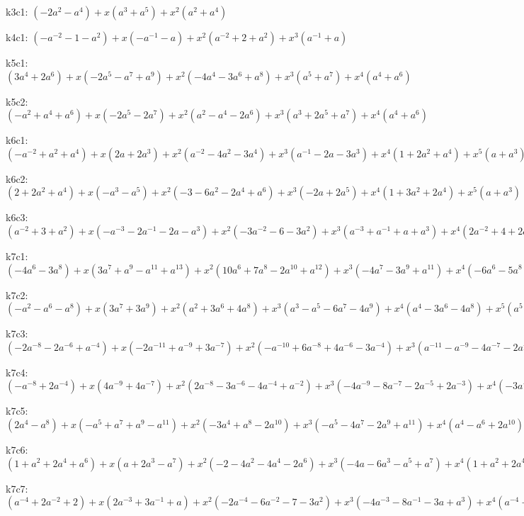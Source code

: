 k3c1: $ (-2a^{2}-a^{4}) +x(a^{3}+a^{5}) +x^{2}(a^{2}+a^{4}) $

k4c1: $ (-a^{-2}-1-a^{2}) +x(-a^{-1}-a) +x^{2}(a^{-2}+2+a^{2}) +x^{3}(a^{-1}+a) $

k5c1: $ (3a^{4}+2a^{6}) +x(-2a^{5}-a^{7}+a^{9}) +x^{2}(-4a^{4}-3a^{6}+a^{8}) +x^{3}(a^{5}+a^{7}) +x^{4}(a^{4}+a^{6}) $

k5c2: $ (-a^{2}+a^{4}+a^{6}) +x(-2a^{5}-2a^{7}) +x^{2}(a^{2}-a^{4}-2a^{6}) +x^{3}(a^{3}+2a^{5}+a^{7}) +x^{4}(a^{4}+a^{6}) $

k6c1: $ (-a^{-2}+a^{2}+a^{4}) +x(2a+2a^{3}) +x^{2}(a^{-2}-4a^{2}-3a^{4}) +x^{3}(a^{-1}-2a-3a^{3}) +x^{4}(1+2a^{2}+a^{4}) +x^{5}(a+a^{3}) $

k6c2: $ (2+2a^{2}+a^{4}) +x(-a^{3}-a^{5}) +x^{2}(-3-6a^{2}-2a^{4}+a^{6}) +x^{3}(-2a+2a^{5}) +x^{4}(1+3a^{2}+2a^{4}) +x^{5}(a+a^{3}) $

k6c3: $ (a^{-2}+3+a^{2}) +x(-a^{-3}-2a^{-1}-2a-a^{3}) +x^{2}(-3a^{-2}-6-3a^{2}) +x^{3}(a^{-3}+a^{-1}+a+a^{3}) +x^{4}(2a^{-2}+4+2a^{2}) +x^{5}(a^{-1}+a) $

k7c1: $ (-4a^{6}-3a^{8}) +x(3a^{7}+a^{9}-a^{11}+a^{13}) +x^{2}(10a^{6}+7a^{8}-2a^{10}+a^{12}) +x^{3}(-4a^{7}-3a^{9}+a^{11}) +x^{4}(-6a^{6}-5a^{8}+a^{10}) +x^{5}(a^{7}+a^{9}) +x^{6}(a^{6}+a^{8}) $

k7c2: $ (-a^{2}-a^{6}-a^{8}) +x(3a^{7}+3a^{9}) +x^{2}(a^{2}+3a^{6}+4a^{8}) +x^{3}(a^{3}-a^{5}-6a^{7}-4a^{9}) +x^{4}(a^{4}-3a^{6}-4a^{8}) +x^{5}(a^{5}+2a^{7}+a^{9}) +x^{6}(a^{6}+a^{8}) $

k7c3: $ (-2a^{-8}-2a^{-6}+a^{-4}) +x(-2a^{-11}+a^{-9}+3a^{-7}) +x^{2}(-a^{-10}+6a^{-8}+4a^{-6}-3a^{-4}) +x^{3}(a^{-11}-a^{-9}-4a^{-7}-2a^{-5}) +x^{4}(a^{-10}-3a^{-8}-3a^{-6}+a^{-4}) +x^{5}(a^{-9}+2a^{-7}+a^{-5}) +x^{6}(a^{-8}+a^{-6}) $

k7c4: $ (-a^{-8}+2a^{-4}) +x(4a^{-9}+4a^{-7}) +x^{2}(2a^{-8}-3a^{-6}-4a^{-4}+a^{-2}) +x^{3}(-4a^{-9}-8a^{-7}-2a^{-5}+2a^{-3}) +x^{4}(-3a^{-8}+3a^{-4}) +x^{5}(a^{-9}+3a^{-7}+2a^{-5}) +x^{6}(a^{-8}+a^{-6}) $

k7c5: $ (2a^{4}-a^{8}) +x(-a^{5}+a^{7}+a^{9}-a^{11}) +x^{2}(-3a^{4}+a^{8}-2a^{10}) +x^{3}(-a^{5}-4a^{7}-2a^{9}+a^{11}) +x^{4}(a^{4}-a^{6}+2a^{10}) +x^{5}(a^{5}+3a^{7}+2a^{9}) +x^{6}(a^{6}+a^{8}) $

k7c6: $ (1+a^{2}+2a^{4}+a^{6}) +x(a+2a^{3}-a^{7}) +x^{2}(-2-4a^{2}-4a^{4}-2a^{6}) +x^{3}(-4a-6a^{3}-a^{5}+a^{7}) +x^{4}(1+a^{2}+2a^{4}+2a^{6}) +x^{5}(2a+4a^{3}+2a^{5}) +x^{6}(a^{2}+a^{4}) $

k7c7: $ (a^{-4}+2a^{-2}+2) +x(2a^{-3}+3a^{-1}+a) +x^{2}(-2a^{-4}-6a^{-2}-7-3a^{2}) +x^{3}(-4a^{-3}-8a^{-1}-3a+a^{3}) +x^{4}(a^{-4}+2a^{-2}+4+3a^{2}) +x^{5}(2a^{-3}+5a^{-1}+3a) +x^{6}(a^{-2}+1) $

